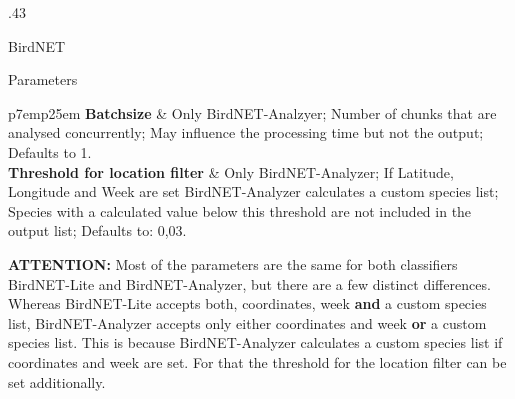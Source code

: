 \documentclass[final,hyperref={pdfpagelabels=false}]{beamer}
\begin{document}
\begin{frame}[fragile]{}
\begin{columns}[t]
\begin{column}{.43\linewidth}
\begin{block}{BirdNET}
\begin{subblock}{Parameters}
{\begin{tabular}{p{7em}p{25em}}
\textbf{Batchsize} & Only BirdNET-Analzyer; Number of chunks that are analysed concurrently; May influence the processing time but not the output; Defaults to 1.\\
\textbf{Threshold for location filter} & Only BirdNET-Analyzer; If Latitude, Longitude and Week are set BirdNET-Analyzer calculates a custom species list; Species with a calculated value below this \mbox{threshold} are not included in the output list; Defaults to: 0,03. \\
\end{tabular}
}
	\end{subblock}
	\textbf{ATTENTION:} Most of the parameters are the same for both classifiers BirdNET-Lite and BirdNET-Analyzer, but there are a few distinct differences.
	Whereas BirdNET-Lite accepts both, coordinates, week \textbf{and} a custom species list, BirdNET-Analyzer accepts only either coordinates and week \textbf{or} a custom species list.
	This is because BirdNET-Analyzer calculates a custom species list if coordinates and week are set.
	For that the threshold for the location filter can be set additionally.

\end{block}
      \end{column}
    \end{columns}
    \vfill
  \end{frame}

\end{document}
